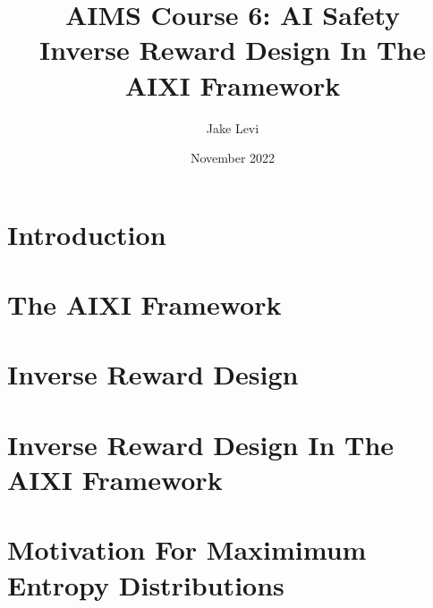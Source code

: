 \documentclass{article}
\title{
    AIMS Course 6: AI Safety \\
    \large Inverse Reward Design In The AIXI Framework
}
\author{Jake Levi}
\date{November 2022}
\begin{document}
\maketitle
\section{Introduction} \label{section:intro}

\section{The AIXI Framework}

\section{Inverse Reward Design}

\section{Inverse Reward Design In The AIXI Framework}



\appendix
\section{Motivation For Maximimum Entropy Distributions}\label{appendix:why max ent}

\end{document}
